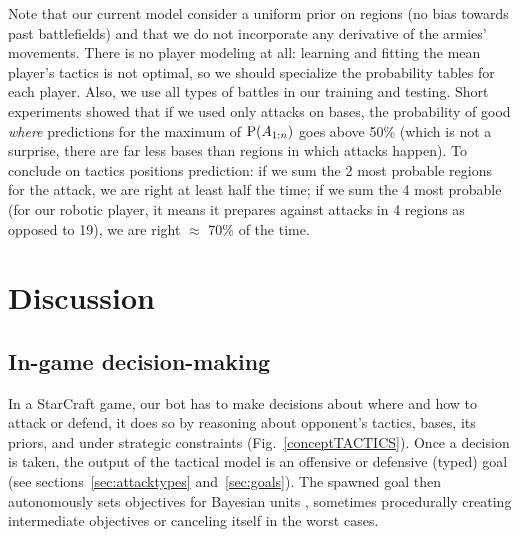 Note that our current model consider a uniform prior on regions (no bias towards past battlefields) and that we do not incorporate any derivative of the armies' movements. There is no player modeling at all: learning and fitting the mean player's tactics is not optimal, so we should specialize the probability tables for each player. Also, we use all types of battles in our training and testing. Short experiments showed that if we used only attacks on bases, the probability of good \textit{where} predictions for the maximum of $\mathrm{P}(A_{1:n})$ goes above 50\% (which is not a surprise, there are far less bases than regions in which attacks happen). To conclude on tactics positions prediction: if we sum the 2 most probable regions for the attack, we are right at least half the time; if we sum the 4 most probable (for our robotic player, it means it prepares against attacks in 4 regions as opposed to 19), we are right $\approx$ 70\% of the time.



\section{Discussion}

\subsection{In-game decision-making}

In a StarCraft game, our bot has to make decisions about where and how to attack or defend, it does so by reasoning about opponent's tactics, bases, its priors, and under strategic constraints (Fig.~\ref{conceptTACTICS}). Once a decision is taken, the output of the tactical model is an offensive or defensive (typed) goal (see sections~\ref{sec:attacktypes} and~\ref{sec:goals}). %
The spawned goal then autonomously sets objectives for Bayesian units \cite{SYNNAEVE:Micro}, sometimes procedurally creating intermediate objectives or canceling itself in the worst cases. 

